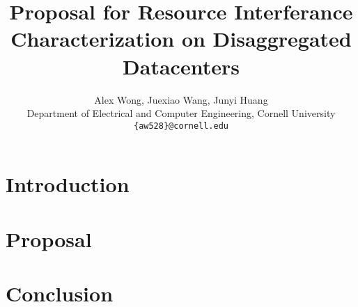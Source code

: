 \documentclass{article}
\title{Proposal for Resource Interferance Characterization on Disaggregated Datacenters}
\author{
    \vspace{6px}
    Alex Wong, Juexiao Wang, Junyi Huang \\
    Department of Electrical and Computer Engineering, Cornell University \\
    \texttt{\{aw528\}@cornell.edu}
}
\let\ACMmaketitle=\maketitle
\renewcommand{\maketitle}{\begingroup\let\footnote=\thanks\ACMmaketitle\endgroup}
\begin{document}
\maketitle

\onehalfspacing

\section{Introduction}

\section{Proposal}

\section{Conclusion}
\end{document}
